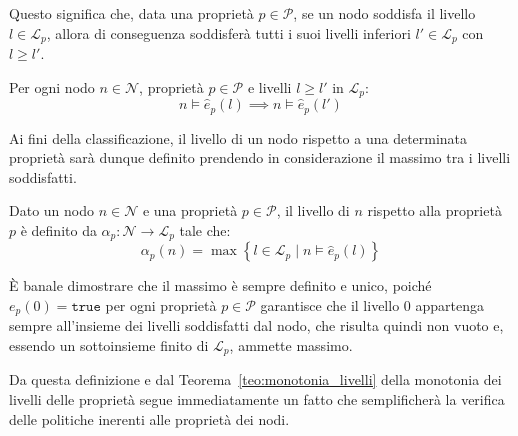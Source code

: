 Questo significa che, data una proprietà $p \in \mathcal{P}$, se un nodo soddisfa il livello $l \in \mathcal{L}_p$, allora di conseguenza soddisferà tutti i suoi livelli inferiori $l' \in \mathcal{L}_p$ con $l \geq l'$.

\begin{corollary}
    \label{cor:implicazione_livelli}
    Per ogni nodo $n \in \mathcal{N}$, proprietà $p \in \mathcal{P}$ e livelli $l \geq l'$ in $\mathcal{L}_p$:
    \begin{equation}
        n \models \hat{e}_p(l) \implies n \models \hat{e}_p(l')
    \end{equation}
\end{corollary}

Ai fini della classificazione, il livello di un nodo rispetto a una determinata proprietà sarà dunque definito prendendo in considerazione il massimo tra i livelli soddisfatti.

\begin{definition}
    \label{def:livello_nodo}
    Dato un nodo $n \in \mathcal{N}$ e una proprietà $p \in \mathcal{P}$, il livello di $n$ rispetto alla proprietà $p$ è definito da $\alpha_p : \mathcal{N} \rightarrow \mathcal{L}_p$ tale che:
    \begin{equation}
        \alpha_p(n) = \max \left\{ l \in \mathcal{L}_p \mid n \models \hat{e}_p(l) \right\}
    \end{equation}
\end{definition}

È banale dimostrare che il massimo è sempre definito e unico, poiché $e_p(0) = \mathtt{true}$ per ogni proprietà $p \in \mathcal{P}$ garantisce che il livello $0$ appartenga sempre all'insieme dei livelli soddisfatti dal nodo, che risulta quindi non vuoto e, essendo un sottoinsieme finito di $\mathcal{L}_p$, ammette massimo. 

Da questa definizione e dal Teorema~\ref{teo:monotonia_livelli} della monotonia dei livelli delle proprietà segue immediatamente un fatto che semplificherà la verifica delle politiche inerenti alle proprietà dei nodi.

